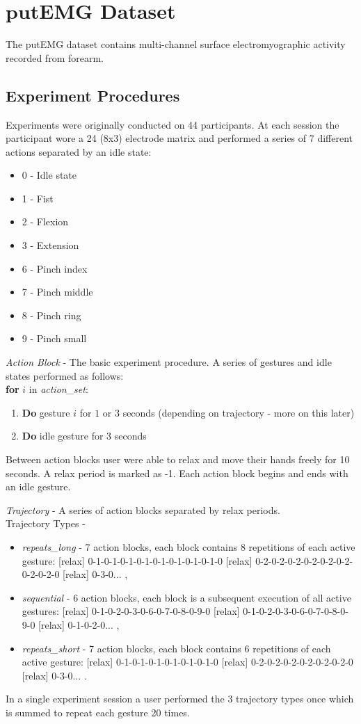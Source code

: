 \section{ $\textbf{putEMG}$ Dataset}
The putEMG dataset \cite{Kaczmarek2019PutEMGADataset} contains multi-channel surface electromyographic activity recorded from forearm. 
\subsection{Experiment Procedures}
Experiments were originally conducted on 44 participants. At each session the participant wore a 24 (8x3) electrode matrix and performed a series of 7 different actions separated by an idle state:
\begin{itemize}
    \item 0 - Idle state
    \item 1 - Fist
    \item 2 - Flexion
    \item 3 - Extension
    \item 6 - Pinch index
    \item 7 - Pinch middle
    \item 8 - Pinch ring
    \item 9 - Pinch small
\end{itemize}

\textit{Action Block} - The basic experiment procedure. A series of gestures and idle states performed as follows:\\

\textbf{for} $i$ in \textit{action\_set}:
\begin{enumerate}
    \item  \textbf{Do} gesture $i$ for $1$ or $3$ seconds (depending on trajectory - more on this later)
    \item   \textbf{Do} idle gesture for $3$ seconds
\end{enumerate}
 Between action blocks user were able to relax and move their hands freely for 10 seconds. A relax period is marked as -1. Each action block begins and ends with an idle gesture.

\textit{Trajectory} - A series of action blocks separated by relax periods.\\
Trajectory Types - 
\begin{itemize}
    \item \textit{repeats\_long} - 7 action blocks, each block contains 8 repetitions of each active gesture: [relax] 0-1-0-1-0-1-0-1-0-1-0-1-0-1-0-1-0 [relax] 0-2-0-2-0-2-0-2-0-2-0-2-0-2-0-2-0 [relax] 0-3-0... ,
    \item \textit{sequential} - 6 action blocks, each block is a subsequent execution of all active gestures: [relax] 0-1-0-2-0-3-0-6-0-7-0-8-0-9-0 [relax] 0-1-0-2-0-3-0-6-0-7-0-8-0-9-0 [relax] 0-1-0-2-0... ,
    \item \textit{repeats\_short} - 7 action blocks, each block contains 6 repetitions of each active gesture: [relax] 0-1-0-1-0-1-0-1-0-1-0-1-0 [relax] 0-2-0-2-0-2-0-2-0-2-0-2-0 [relax] 0-3-0... .
\end{itemize}
In a single experiment session a user performed the 3 trajectory types once which is summed to repeat each gesture 20 times.

